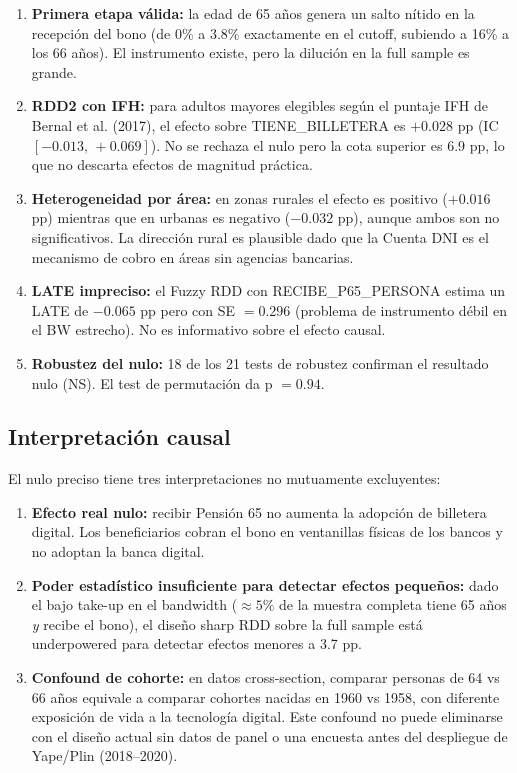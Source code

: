 \documentclass[12pt, a4paper]{article}
\begin{document}
\begin{enumerate}
  \item \textbf{Primera etapa válida:} la edad de 65 años genera un salto
    nítido en la recepción del bono (de 0\% a 3.8\% exactamente en el
    cutoff, subiendo a 16\% a los 66 años). El instrumento existe, pero la
    dilución en la full sample es grande.
  \item \textbf{RDD2 con IFH:} para adultos mayores elegibles según el
    puntaje IFH de Bernal et al. (2017), el efecto sobre TIENE\_BILLETERA
    es $+0.028$ pp (IC $[-0.013,\, +0.069]$). No se rechaza el nulo pero
    la cota superior es 6.9 pp, lo que no descarta efectos de magnitud
    práctica.
  \item \textbf{Heterogeneidad por área:} en zonas rurales el efecto es
    positivo ($+0.016$ pp) mientras que en urbanas es negativo ($-0.032$ pp),
    aunque ambos son no significativos. La dirección rural es plausible dado
    que la Cuenta DNI es el mecanismo de cobro en áreas sin agencias bancarias.
  \item \textbf{LATE impreciso:} el Fuzzy RDD con RECIBE\_P65\_PERSONA estima
    un LATE de $-0.065$ pp pero con SE $= 0.296$ (problema de instrumento
    débil en el BW estrecho). No es informativo sobre el efecto causal.
  \item \textbf{Robustez del nulo:} 18 de los 21 tests de robustez confirman
    el resultado nulo (NS). El test de permutación da p $= 0.94$.
\end{enumerate}

\subsection{Interpretación causal}

El nulo preciso tiene tres interpretaciones no mutuamente excluyentes:

\begin{enumerate}
  \item \textbf{Efecto real nulo:} recibir Pensión 65 no aumenta la adopción
    de billetera digital. Los beneficiarios cobran el bono en ventanillas
    físicas de los bancos y no adoptan la banca digital.
  \item \textbf{Poder estadístico insuficiente para detectar efectos pequeños:}
    dado el bajo take-up en el bandwidth ($\approx 5\%$ de la muestra completa
    tiene 65 años \textit{y} recibe el bono), el diseño sharp RDD sobre la
    full sample está underpowered para detectar efectos menores a 3.7 pp.
  \item \textbf{Confound de cohorte:} en datos cross-section, comparar personas
    de 64 vs 66 años equivale a comparar cohortes nacidas en 1960 vs 1958,
    con diferente exposición de vida a la tecnología digital. Este confound
    no puede eliminarse con el diseño actual sin datos de panel o una
    encuesta antes del despliegue de Yape/Plin (2018--2020).
\end{enumerate}
\end{document}
